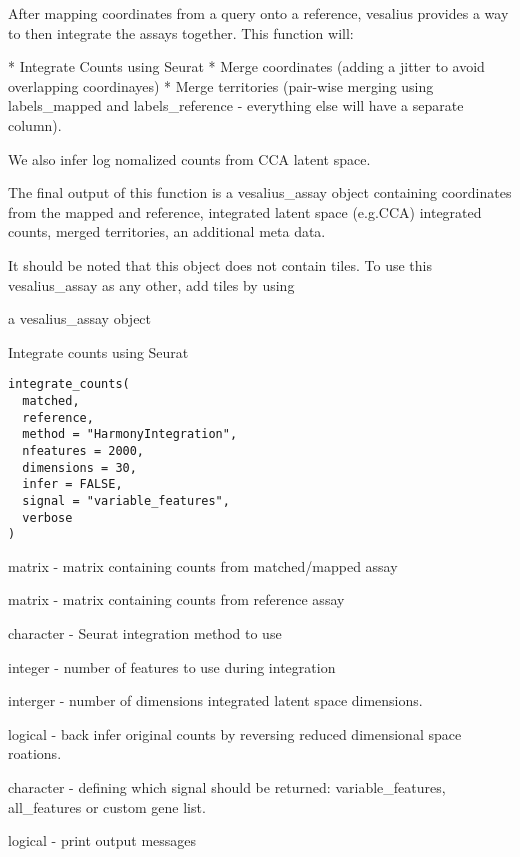 \documentclass[a4paper]{book}
\begin{document}
\begin{Details}
After mapping coordinates from a query onto a reference, vesalius
provides a way to then integrate the assays together. This function will:

* Integrate Counts using Seurat 
* Merge coordinates (adding a jitter to avoid overlapping coordinayes)
* Merge territories (pair-wise merging using labels\_mapped and labels\_reference 
- everything else will have a separate column).

We also infer log nomalized counts from CCA latent space. 

The final output of this function is a vesalius\_assay object containing 
coordinates from the mapped and reference, integrated latent space (e.g.CCA)
integrated counts, merged territories, an additional meta data.

It should be noted that this object does not contain tiles. To use this 
vesalius\_assay as any other, add tiles by using 
\end{Details}
%
\begin{Value}
a vesalius\_assay object
\end{Value}
%
\begin{Description}
Integrate counts using Seurat
\end{Description}
%
\begin{Usage}
\begin{verbatim}
integrate_counts(
  matched,
  reference,
  method = "HarmonyIntegration",
  nfeatures = 2000,
  dimensions = 30,
  infer = FALSE,
  signal = "variable_features",
  verbose
)
\end{verbatim}
\end{Usage}
%
\begin{Arguments}
\begin{ldescription}
\item[\code{matched}] matrix - matrix containing counts from matched/mapped assay

\item[\code{reference}] matrix - matrix containing counts from reference assay

\item[\code{method}] character - Seurat integration method to use

\item[\code{nfeatures}] integer - number of features to use during integration

\item[\code{dimensions}] interger - number of dimensions integrated latent space
dimensions.

\item[\code{infer}] logical - back infer original counts by reversing reduced 
dimensional space roations.

\item[\code{signal}] character - defining which signal should be returned:
variable\_features, all\_features or custom gene list.

\item[\code{verbose}] logical - print output messages
\end{ldescription}
\end{Arguments}
\end{document}
